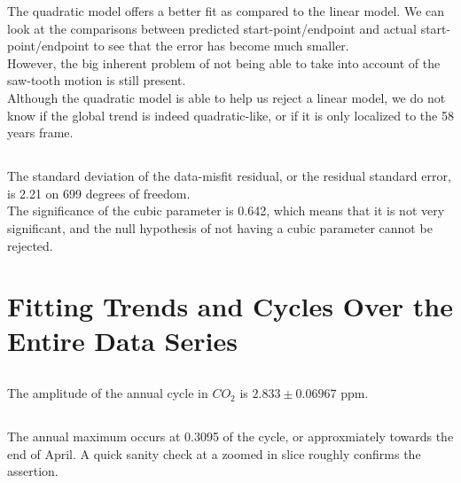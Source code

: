 \documentclass[paper=a4, fontsize=11pt]{scrartcl}
\numberwithin{equation}{section} %
\numberwithin{figure}{section} %
\numberwithin{table}{section} %
\begin{document}
The quadratic model offers a better fit as compared to the linear model. We can look at the comparisons between predicted start-point/endpoint and actual start-point/endpoint to see that the error has become much smaller. \\

However, the big inherent problem of not being able to take into account of the saw-tooth motion is still present. \\

Although the quadratic model is able to help us reject a linear model, we do not know if the global trend is indeed quadratic-like, or if it is only localized to the 58 years frame.

\subsection{}
 
The standard deviation of the data-misfit residual, or the residual standard error, is 2.21 on 699 degrees of freedom.\\

The significance of the cubic parameter is 0.642, which means that it is not very significant, and the null hypothesis of not having a cubic parameter cannot be rejected.

\section{Fitting Trends and Cycles Over the Entire Data Series}

\subsection{}

The amplitude of the annual cycle in $CO_2$ is $2.833\pm0.06967$ ppm.

\subsection{}

The annual maximum occurs at 0.3095 of the cycle, or approxmiately towards the end of April. A quick sanity check at a zoomed in slice roughly confirms the assertion.
\end{document}
